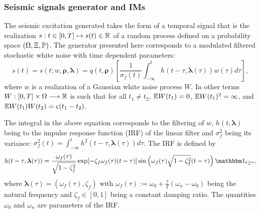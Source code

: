


\subsubsection{Seismic signals generator and IMs}

The seismic excitation generated takes the form of a temporal signal that is the realization $s:t\in[0,T]\mapsto s(t)\in\mathbb{R}$ of a random process defined on a probability space $(\Omega,\Xi,\mathbb{P})$. The generator presented here corresponds to a modulated filtered stochastic white noise with time dependent parameters:
    \begin{equation}
        s(t)= s(t;w,\boldsymbol{\rho},\boldsymbol{\lambda}) = q(t,\boldsymbol\rho)\left[\frac{1}{\sigma_f(t)}\int_{-\infty}^t h(t-\tau,\boldsymbol\lambda(\tau))w(\tau)d\tau \right],
    \end{equation}
where $w$ is a realization of a Gaussian white noise process $W$. In other terms $W:[0,T]\times\Omega\longrightarrow\mathbb{R}$ is such that for all $t_1\ne t_2$, $\mathbb{E} W(t_1)=0$, $\mathbb{E} W(t_1)^2=\infty$, and $\mathbb{E} W(t_1)W(t_2)=\varsigma(t_1-t_2) $.

The integral in the above equation corresponds to the filtering of $w$, $h(t,\boldsymbol{\lambda})$ being to the impulse response function (IRF) of the linear filter and $\sigma_f^2$ being its variance: $\sigma_f^2(t)=\int_{-\infty}^th^2(t-\tau,\boldsymbol{\lambda}(\tau))d\tau$. The IRF is defined by
    \begin{equation}
        h(t-\tau,\boldsymbol{\lambda}(\tau)) = \frac{\omega_f(\tau)}{\sqrt{1-\zeta^2_f}}\exp[-\zeta_f\omega_f(\tau)(t-\tau)]\sin\left(\omega_f(\tau)\sqrt{1-\zeta^2_f}(t-\tau)\right)\indic_{t\geq\tau},
    \end{equation}
where $\boldsymbol{\lambda}(\tau)=(\omega_f(\tau),\zeta_f) $ with $\omega_f(\tau):=\omega_0+\frac{\tau}{T}(\omega_n-\omega_0)$ being the natural frequency and $\zeta_f\in[0,1]$ being a constant damping ratio. The quantities $\omega_0$ and $\omega_n$ are parameters of the IRF.

